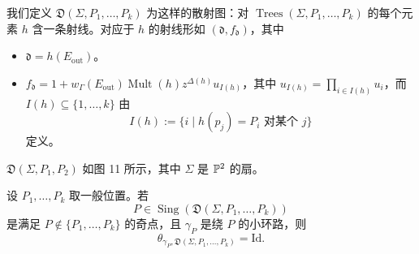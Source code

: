 \begin{definition}
我们定义 $\mathfrak D(\Sigma,P_1,\ldots,P_k)$ 为这样的散射图：对 $\operatorname{Trees}(\Sigma,P_1,\ldots,P_k)$ 的每个元素 $h$ 含一条射线。对应于 $h$ 的射线形如 $(\mathfrak d,f_{\mathfrak d})$，其中
\begin{itemize}
\item $\mathfrak d=h(E_{\mathrm{out}})$。
\item $f_{\mathfrak d}=1+w_\Gamma(E_{\mathrm{out}})\operatorname{Mult}(h)z^{\Delta(h)}u_{I(h)}$，其中 $u_{I(h)}=\prod_{i\in I(h)}u_i$，而 $I(h)\subseteq\{1,\ldots,k\}$ 由
\[
  I(h):=\{i\mid h(p_j)=P_i \text{ 对某个 } j\}
\]
定义。
\end{itemize}
\end{definition}

\begin{example}
$\mathfrak D(\Sigma,P_1,P_2)$ 如图 11 所示，其中 $\Sigma$ 是 $\mathbb{P}^2$ 的扇。
\end{example}

\begin{proposition}
设 $P_1,\ldots,P_k$ 取一般位置。若
\[
  P\in\operatorname{Sing}(\mathfrak D(\Sigma,P_1,\ldots,P_k))
\]
是满足 $P\notin\{P_1,\ldots,P_k\}$ 的奇点，且 $\gamma_P$ 是绕 $P$ 的小环路，则
\[
  \theta_{\gamma_P,\mathfrak D(\Sigma,P_1,\ldots,P_k)}=\mathrm{Id}.
\]
\end{proposition}


